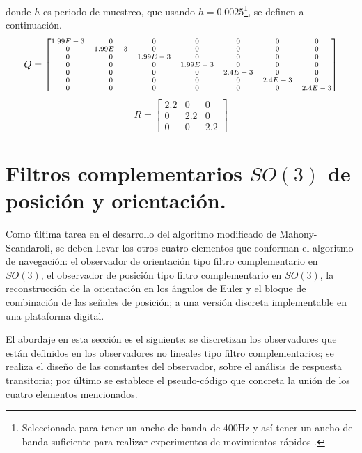 \documentclass[10pt]{report}
\numberwithin{equation}{chapter}
\numberwithin{algorithm}{chapter}
\begin{document}
donde $h$ es periodo de muestreo, que usando $h=0.0025$\footnote{Seleccionada para tener un ancho de banda de 400Hz y así tener un ancho de banda suficiente para realizar experimentos de movimientos rápidos .}, se definen a continuación.
\begin{equation}\label{diseekf_ecc12}
Q=\scriptsize\begin{bmatrix}
1.99E-3&0&0&0&0&0&0\\
0&1.99E-3&0&0&0&0&0\\
0&0&1.99E-3&0&0&0&0\\
0&0&0&1.99E-3&0&0&0\\
0&0&0&0&2.4E-3&0&0\\
0&0&0&0&0&2.4E-3&0\\
0&0&0&0&0&0&2.4E-3\\
\end{bmatrix}
\end{equation}
\begin{equation}\label{diseekf_ecc13}
R=\begin{bmatrix}
2.2&0&0\\
0&2.2&0\\
0&0&2.2
\end{bmatrix}
\end{equation}
\section{Filtros complementarios $SO(3)$ de posición y orientación.}
Como última tarea en el desarrollo del algoritmo modificado de Mahony- Scandaroli, se deben llevar los otros cuatro elementos que conforman el algoritmo de navegación: el observador de orientación tipo filtro complementario en $SO(3)$, el observador de posición tipo filtro complementario en $SO(3)$, la reconstrucción de la orientación en los ángulos de Euler y el bloque de combinación de las señales de posición; a una versión discreta implementable en una plataforma digital. \par
El abordaje en esta sección es el siguiente: se discretizan los observadores que están definidos en los observadores no lineales tipo filtro complementarios; se realiza el diseño de las constantes del observador,  sobre el análisis de respuesta transitoria; por último se establece el pseudo-código que concreta la unión de los cuatro elementos mencionados. 
\end{document}
